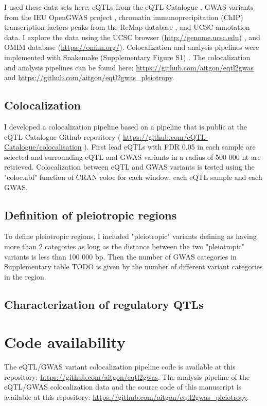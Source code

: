 I used these data sets here: eQTLs from the eQTL Catalogue \citep{2021.Alasoo.Kerimov}, GWAS variants from the IEU OpenGWAS project \citep{2021.Marcora.Lyon}, chromatin immunoprecipitation (ChIP) transcription factors peaks from the ReMap database \citep{2021.Ballester.Hammal}, and UCSC annotation data.
%
I explore the data using the UCSC browser (\url{http://genome.ucsc.edu}) \citep{2021.Kent.Lee}, and OMIM database (\url{https://omim.org/}).
%
Colocalization and analysis pipelines were implemented with Snakemake (Supplementary Figure S1) .
%
The colocalization and analysis pipelines can be found here: \url{https://github.com/aitgon/eqtl2gwas} and \url{https://github.com/aitgon/eqtl2gwas_pleiotropy}.

\subsection*{Colocalization}

I developed a colocalization pipeline based on a pipeline that is public at the eQTL Catalogue Github repository ( \url{https://github.com/eQTL-Catalogue/colocalisation} ).
%
First lead eQTLs with FDR 0.05 in each sample are selected and surrounding eQTL and GWAS variants in a radius of 500 000 nt are retrieved.
%
Colocalization between eQTL and GWAS variants is tested using the "coloc.abf" function of CRAN coloc for each window, each eQTL sample and each GWAS.

\subsection*{Definition of pleiotropic regions}

To define pleiotropic regions, I included "pleiotropic" variants defining as having more than 2 categories as long as the distance between the two "pleiotropic" variants is less than 100 000 bp.
%
Then the number of GWAS categories in Supplementary table TODO is given by the number of different variant categories in the region.

\subsection*{Characterization of regulatory QTLs}

\section*{Code availability}

The eQTL/GWAS variant colocalization pipeline code is available at this repository: \url{https://github.com/aitgon/eqtl2gwas}.
%
The analysis pipeline of the eQTL/GWAS colocalization data and the source code of this manuscript is available at this repository: \url{https://github.com/aitgon/eqtl2gwas_pleiotropy}.

